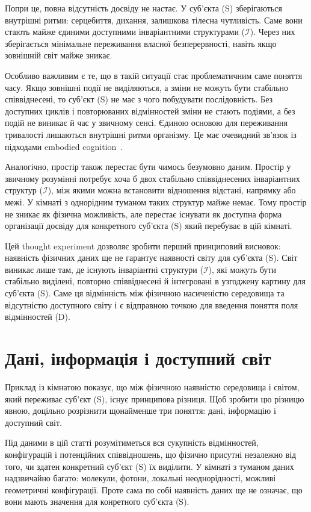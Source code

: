 \documentclass[aps,prd,onecolumn,nofootinbib,superscriptaddress]{revtex4-2} %
\begin{document}
    Попри це, повна відсутність досвіду не настає. У суб’єкта (S) зберігаються внутрішні ритми: серцебиття, дихання, залишкова тілесна чутливість. Саме вони стають майже єдиними доступними інваріантними структурами ($\mathcal{I}$). Через них зберігається мінімальне переживання власної безперервності, навіть якщо зовнішній світ майже зникає.

    Особливо важливим є те, що в такій ситуації стає проблематичним саме поняття часу. Якщо зовнішні події не виділяються, а зміни не можуть бути стабільно співвіднесені, то суб’єкт (S) не має з чого побудувати послідовність. Без доступних циклів і повторюваних відмінностей зміни не стають подіями, а без подій не виникає й час у звичному сенсі. Єдиною основою для переживання тривалості лишаються внутрішні ритми організму. Це має очевидний зв’язок із підходами embodied cognition~\cite{VarelaThompsonRosch1991}.

    Аналогічно, простір також перестає бути чимось безумовно даним. Простір у звичному розумінні потребує хоча б двох стабільно співвіднесених інваріантних структур ($\mathcal{I}$), між якими можна встановити відношення відстані, напрямку або межі. У кімнаті з однорідним туманом таких структур майже немає. Тому простір не зникає як фізична можливість, але перестає існувати як доступна форма організації досвіду для конкретного суб’єкта (S) який перебуває в цій кімнаті.

    Цей thought experiment дозволяє зробити перший принциповий висновок: наявність фізичних даних ще не гарантує наявності світу для суб’єкта (S). Світ виникає лише там, де існують інваріантні структури ($\mathcal{I}$), які можуть бути стабільно виділені, повторно співвіднесені й інтегровані в узгоджену картину для суб’єкта (S). Саме ця відмінність між фізичною насиченістю середовища та відсутністю доступного світу і є відправною точкою для введення поняття поля відмінностей (D).


    \section{Дані, інформація і доступний світ}
    Приклад із кімнатою показує, що між фізичною наявністю середовища і світом, який переживає суб’єкт (S), існує принципова різниця. Щоб зробити цю різницю явною, доцільно розрізнити щонайменше три поняття: дані, інформацію і доступний світ.

    Під даними в цій статті розумітиметься вся сукупність відмінностей, конфігурацій і потенційних співвідношень, що фізично присутні незалежно від того, чи здатен конкретний суб’єкт (S) їх виділити. У кімнаті з туманом даних надзвичайно багато: молекули, фотони, локальні неоднорідності, можливі геометричні конфігурації. Проте сама по собі наявність даних ще не означає, що вони мають значення для конретного суб’єкта (S).
\end{document}
